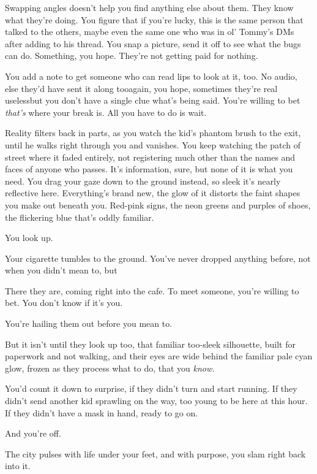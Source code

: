 Swapping angles doesn't help you find anything else about them. They know what they're doing. You figure that if you're lucky, this is the same person that talked to the others, maybe even the same one who was in ol' Tommy's DMs after adding to his thread. You snap a picture, send it off to see what the bugs can do. Something, you hope. They're not getting paid for nothing. 

You add a note to get someone who can read lips to look at it, too. No audio, else they'd have sent it along too\textemdash again, you hope, sometimes they're real useless\textemdash but you don't have a single clue what's being said. You're willing to bet \emph{that's} where your break is. All you have to do is wait. 

Reality filters back in parts, as you watch the kid's phantom brush to the exit, until he walks right through you and vanishes. You keep watching the patch of street where it faded entirely, not registering much other than the names and faces of anyone who passes. It's information, sure, but none of it is what you need. You drag your gaze down to the ground instead, so sleek it's nearly reflective here. Everything's brand new, the glow of it distorts the faint shapes you make out beneath you. Red-pink signs, the neon greens and purples of shoes, the flickering blue that's oddly familiar.

You look up.

Your cigarette tumbles to the ground. You've never dropped anything before, not when you didn't mean to, but\textemdash

There they are, coming right into the cafe. To meet someone, you're willing to bet. You don't know if it's you. 

You're hailing them out before you mean to.


But it isn't until they look up too, that familiar too-sleek silhouette, built for paperwork and not walking, and their eyes are wide behind the familiar pale cyan glow, frozen as they process what to do, that you \emph{know.}

You'd count it down to surprise, if they didn't turn and start running. If they didn't send another kid sprawling on the way, too young to be here at this hour. If they didn't have a mask in hand, ready to go on.

And you're off.

The city pulses with life under your feet, and with purpose, you slam right back into it.

